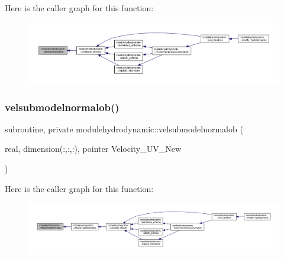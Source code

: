 Here is the caller graph for this function\+:\nopagebreak
\begin{figure}[H]
\begin{center}
\leavevmode
\includegraphics[width=350pt]{namespacemodulehydrodynamic_a3011a9be54d29dbb8d387a2253b36ab3_icgraph}
\end{center}
\end{figure}
\mbox{\label{namespacemodulehydrodynamic_aca265830a6a43d55606480ef5abdb2af}} 
\subsubsection{\texorpdfstring{velsubmodelnormalob()}{velsubmodelnormalob()}}
{\footnotesize\ttfamily subroutine, private modulehydrodynamic\+::velsubmodelnormalob (\begin{DoxyParamCaption}\item[{real, dimension(\+:,\+:,\+:), pointer}]{Velocity\+\_\+\+U\+V\+\_\+\+New }\end{DoxyParamCaption})\hspace{0.3cm}{\ttfamily [private]}}

Here is the caller graph for this function\+:\nopagebreak
\begin{figure}[H]
\begin{center}
\leavevmode
\includegraphics[width=350pt]{namespacemodulehydrodynamic_aca265830a6a43d55606480ef5abdb2af_icgraph}
\end{center}
\end{figure}
\mbox{\label{namespacemodulehydrodynamic_ac476fd6c2f59116c8cbcbed954fdbc5f}} 
